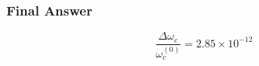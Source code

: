 \subsubsection*{Final Answer}

\[
\boxed{\frac{\Delta\omega_c}{\omega_c^{(0)}}=2.85\times10^{-12}}
\]
